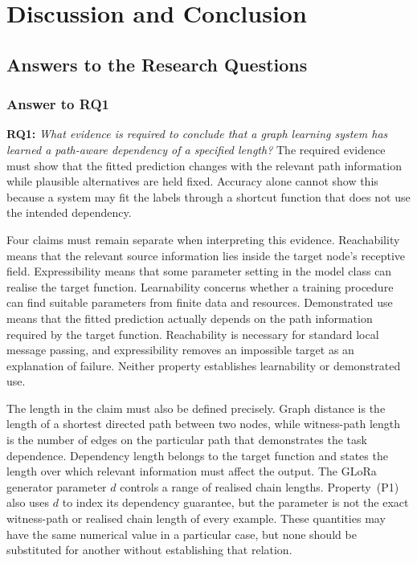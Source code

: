 \chapter{Discussion and Conclusion}
\label{chap:discussion-conclusion}

\section{Answers to the Research Questions}

\subsection{Answer to RQ1}

\noindent\textbf{RQ1:} \emph{What evidence is required to conclude that a graph learning system has learned a path-aware dependency of a specified length?}
The required evidence must show that the fitted prediction changes with the relevant path information while plausible alternatives are held fixed.
Accuracy alone cannot show this because a system may fit the labels through a shortcut function that does not use the intended dependency.

Four claims must remain separate when interpreting this evidence.
Reachability means that the relevant source information lies inside the target node's receptive field.
Expressibility means that some parameter setting in the model class can realise the target function.
Learnability concerns whether a training procedure can find suitable parameters from finite data and resources.
Demonstrated use means that the fitted prediction actually depends on the path information required by the target function.
Reachability is necessary for standard local message passing, and expressibility removes an impossible target as an explanation of failure.
Neither property establishes learnability or demonstrated use.

The length in the claim must also be defined precisely.
Graph distance is the length of a shortest directed path between two nodes, while witness-path length is the number of edges on the particular path that demonstrates the task dependence.
Dependency length belongs to the target function and states the length over which relevant information must affect the output.
The GLoRa generator parameter $d$ controls a range of realised chain lengths.
Property~(P1) also uses $d$ to index its dependency guarantee, but the parameter is not the exact witness-path or realised chain length of every example.
These quantities may have the same numerical value in a particular case, but none should be substituted for another without establishing that relation.

